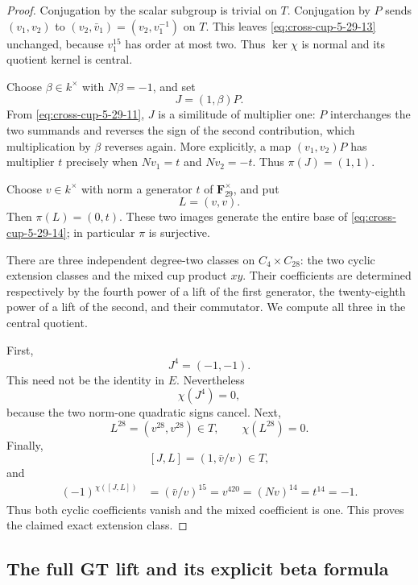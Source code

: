 \begin{proof}
Conjugation by the scalar subgroup is trivial on \(T\).
Conjugation by \(P\) sends \((v_1,v_2)\) to
\((v_2,\bar v_1)=(v_2,v_1^{-1})\) on \(T\).
This leaves \eqref{eq:cross-cup-5-29-13} unchanged, because \(v_1^{15}\)
has order at most two.
Thus \(\ker\chi\) is normal and its quotient kernel is
central.

Choose \(\beta\in k^\times\) with \(N\beta=-1\), and set
\[
                          J=(1,\beta)P.
\]
From \eqref{eq:cross-cup-5-29-11}, \(J\) is a similitude of multiplier one:
\(P\) interchanges the two summands and reverses the
sign of the second contribution, which multiplication
by \(\beta\) reverses again.
More explicitly, a map \((v_1,v_2)P\) has multiplier
\(t\) precisely when \(Nv_1=t\) and \(Nv_2=-t\).
Thus \(\pi(J)=(1,1)\).

Choose \(v\in k^\times\) with norm a generator \(t\)
of \(\mathbf F_{29}^\times\), and put
\[
                             L=(v,v).
\]
Then \(\pi(L)=(0,t)\).
These two images generate the entire base of \eqref{eq:cross-cup-5-29-14};
in particular \(\pi\) is surjective.

There are three independent degree-two classes on
\(C_4\times C_{28}\): the two cyclic extension classes
and the mixed cup product \(xy\).
Their coefficients are determined respectively by
the fourth power of a lift of the first generator,
the twenty-eighth power of a lift of the second,
and their commutator.
We compute all three in the central quotient.

First,
\[
                       J^4=(-1,-1).
\]
This need not be the identity
in \(E\).
Nevertheless
\[
                       \chi(J^4)=0,
\]
because the two norm-one quadratic signs cancel.
Next,
\[
                       L^{28}=(v^{28},v^{28})\in T,
 \qquad                 \chi(L^{28})=0.
\]
Finally,
\[
                       [J,L]=(1,\bar v/v)\in T,
\]
and
\begin{equation}
 \begin{split}
 (-1)^{\chi([J,L])}
   &=(\bar v/v)^{15}
     =v^{420}
     =(Nv)^{14}
     =t^{14}
     =-1 .
 \end{split}                                               \label{eq:cross-cup-5-29-15}
\end{equation}
Thus both cyclic coefficients vanish and the mixed
coefficient is one. This proves the claimed exact
extension class.
\end{proof}

\subsection{The full GT lift and its explicit beta formula}

